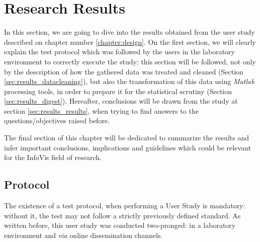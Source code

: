 
\chapter{Research Results}
\label{chapter:results}
%
In this section, we are going to dive into the results obtained from the user study described on chapter number \ref{chapter:design}.
On the first section, we will clearly explain the test protocol which was followed by the users in the laboratory environment to correctly
execute the study; this section will be followed, not only by the description of how the gathered data was treated and cleaned
(Section \ref{sec:results_datacleaning}), but also the transformation of this data using \emph{Matlab} processing tools, in order to prepare
it for the statistical scrutiny (Section \ref{sec:results_digest}). Hereafter, conclusions will be drawn from the study at section
\ref{sec:results_results}, when trying to find answers to the questions/objectives raised before. \par
%
The final section of this chapter will be dedicated to summarize the results and infer important conclusions, implications and guidelines which
could be relevant for the InfoVis field of research.
%
\section{Protocol}
\label{sec:results_protocol}
%
The existence of a test protocol, when performing a User Study is mandatory: without it, the test may not follow a strictly previously defined
standard. As written before, this user study was conducted two-pronged: in a laboratory environment and \emph{via} online dissemination channels. \par
%
